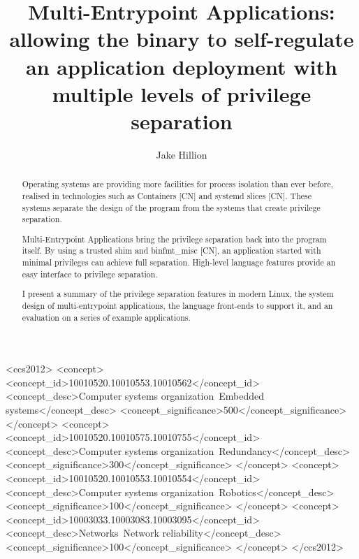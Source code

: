 \documentclass[sigplan]{acmart}
\begin{document}
\title[Multi-Entrypoint Applications]{Multi-Entrypoint Applications: allowing the binary to self-regulate an application deployment with multiple levels of privilege separation}

\author{Jake Hillion}


\begin{abstract}
  Operating systems are providing more facilities for process isolation than ever before, realised in technologies such as Containers [CN] and systemd slices [CN]. These systems separate the design of the program from the systems that create privilege separation.
  
  Multi-Entrypoint Applications bring the privilege separation back into the program itself. By using a trusted  shim and binfmt\_misc [CN], an application started with minimal privileges can achieve full separation. High-level language features provide an easy interface to privilege separation.
  
  I present a summary of the privilege separation features in modern Linux, the system design of multi-entrypoint applications, the language front-ends to support it, and an evaluation on a series of example applications. 
\end{abstract}

\begin{CCSXML}
<ccs2012>
 <concept>
  <concept_id>10010520.10010553.10010562</concept_id>
  <concept_desc>Computer systems organization~Embedded systems</concept_desc>
  <concept_significance>500</concept_significance>
 </concept>
 <concept>
  <concept_id>10010520.10010575.10010755</concept_id>
  <concept_desc>Computer systems organization~Redundancy</concept_desc>
  <concept_significance>300</concept_significance>
 </concept>
 <concept>
  <concept_id>10010520.10010553.10010554</concept_id>
  <concept_desc>Computer systems organization~Robotics</concept_desc>
  <concept_significance>100</concept_significance>
 </concept>
 <concept>
  <concept_id>10003033.10003083.10003095</concept_id>
  <concept_desc>Networks~Network reliability</concept_desc>
  <concept_significance>100</concept_significance>
 </concept>
</ccs2012>
\end{CCSXML}
\end{document}
